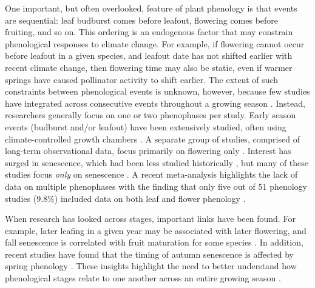 \documentclass{article}
\begin{document}
\par One important, but often overlooked, feature of plant phenology is that events are sequential: leaf budburst comes before leafout, flowering comes before fruiting, and so on. This ordering is an endogenous factor that may constrain phenological responses to climate change. For example, if flowering cannot occur before leafout in a given species, and leafout date has not shifted earlier with recent climate change, then flowering time may also be static, even if warmer springs have caused pollinator activity to shift earlier. The extent of such constraints between phenological events is unknown, however, because few studies have integrated across consecutive events throughout a growing season \citep{wolkovich2014}. Instead, researchers generally focus on one or two phenophases per study. Early season events (budburst and/or leafout) have been extensively studied, often using climate-controlled growth chambers \citep[e.g.,][]{basler2012,laube2014}. A separate group of studies, comprised of long-term observational data, focus primarily on flowering only  \citep[e.g.,] []{fitter2002,millerrushing2008}. Interest has surged in senescence, which had been less studied historically \citep {parmesan2006}, but many of these studies focus \textit{only} on senescence \citep[e.g.][]{taylor2008,archetti2013,jeong2014}. A recent meta-analysis highlights the lack of data on multiple phenophases with the finding that only five out of 51 phenology studies (9.8\%) included data on both leaf and flower phenology \citep{wolkovich2012}. 

\par When research has looked across stages, important links have been found. For example, later  leafing in a given year may be associated with later flowering, and fall senescence is correlated with fruit maturation for some species \citep{lechowicz1995}. In addition, recent studies have found that the timing of autumn senescence is affected by spring phenology \citep {keenan2015,liu2016}. These insights highlight the need to better understand how phenological stages relate to one another across an entire growing season \citep{wolkovich2014}.
\end{document}
